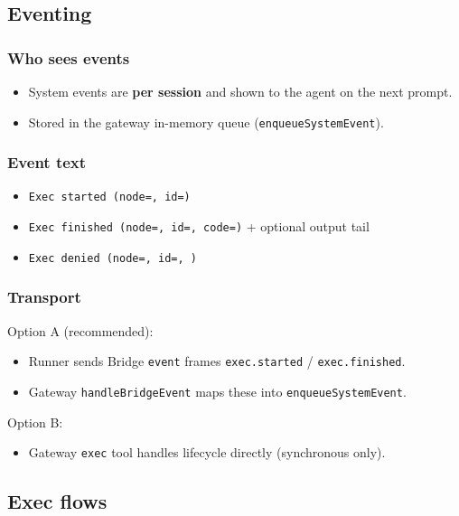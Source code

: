 \subsection{Eventing}


\subsubsection{Who sees events}


\begin{itemize}
  \item System events are \textbf{per session} and shown to the agent on the next prompt.
  \item Stored in the gateway in-memory queue (\texttt{enqueueSystemEvent}).
\end{itemize}


\subsubsection{Event text}


\begin{itemize}
  \item \texttt{Exec started (node=, id=)}
  \item \texttt{Exec finished (node=, id=, code=)} + optional output tail
  \item \texttt{Exec denied (node=, id=, )}
\end{itemize}


\subsubsection{Transport}


Option A (recommended):

\begin{itemize}
  \item Runner sends Bridge \texttt{event} frames \texttt{exec.started} / \texttt{exec.finished}.
  \item Gateway \texttt{handleBridgeEvent} maps these into \texttt{enqueueSystemEvent}.
\end{itemize}


Option B:

\begin{itemize}
  \item Gateway \texttt{exec} tool handles lifecycle directly (synchronous only).
\end{itemize}


\subsection{Exec flows}


